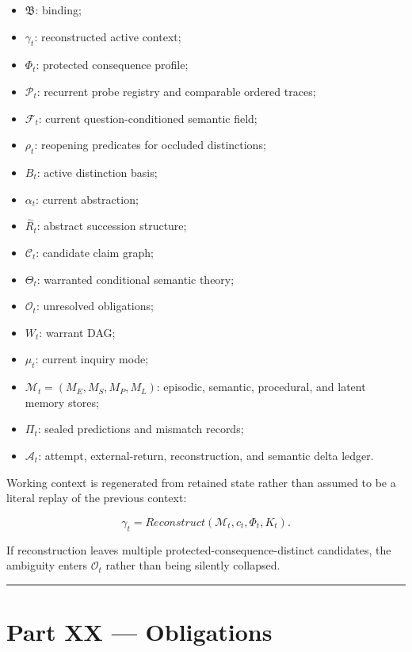 \documentclass[
]{article}
\providecommand{\tightlist}{%
  \setlength{\itemsep}{0pt}\setlength{\parskip}{0pt}}
\begin{document}
\begin{itemize}
\tightlist
\item \(\mathfrak B\): binding;
\item \(\gamma_t\): reconstructed active context;
\item \(\Phi_t\): protected consequence profile;
\item \(\mathcal P_t\): recurrent probe registry and comparable ordered traces;
\item \(\mathcal F_t\): current question-conditioned semantic field;
\item \(\rho_t\): reopening predicates for occluded distinctions;
\item \(B_t\): active distinction basis;
\item \(\alpha_t\): current abstraction;
\item \(\widehat R_t\): abstract succession structure;
\item \(\mathcal C_t\): candidate claim graph;
\item \(\Theta_t\): warranted conditional semantic theory;
\item \(\mathcal O_t\): unresolved obligations;
\item \(W_t\): warrant DAG;
\item \(\mu_t\): current inquiry mode;
\item \(\mathcal M_t=(M_E,M_S,M_P,M_L)\): episodic, semantic,
  procedural, and latent memory stores;
\item \(\Pi_t\): sealed predictions and mismatch records;
\item \(\mathcal A_t\): attempt, external-return, reconstruction, and semantic
  delta ledger.
\end{itemize}

Working context is regenerated from retained state rather than assumed to be a
literal replay of the previous context:

\[
\boxed{
\gamma_t
=
Reconstruct(\mathcal M_t,c_t,\Phi_t,K_t).
}
\]

If reconstruction leaves multiple protected-consequence-distinct candidates,
the ambiguity enters \(\mathcal O_t\) rather than being silently collapsed.

\begin{center}\rule{0.5\linewidth}{0.5pt}\end{center}

\section{Part XX --- Obligations}\label{part-xx-obligations}
\end{document}
